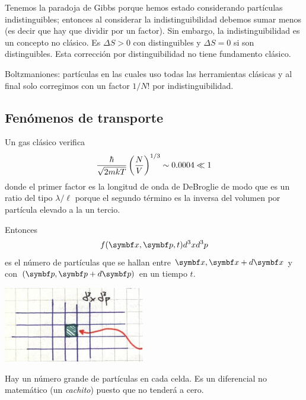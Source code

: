 \documentclass[10pt,oneside]{CBFT_book}
\begin{document}
Tenemos la paradoja de Gibbs porque hemos estado considerando partículas indistinguibles; entonces
al considerar la indistinguibilidad debemos sumar menos (es decir que hay que dividir por un
factor). Sin embargo, la indistinguibilidad es un concepto no clásico.
Es $ \Delta S > 0 $ con distinguibles y $ \Delta S = 0 $ si son distinguibles.
Esta corrección por distinguibilidad no tiene fundamento clásico.

Boltzmaniones: partículas en las cuales uso todas las herramientas clásicas y al final solo
corregimos con un factor $1/N!$ por indistinguibilidad.


\subsection{Fenómenos de transporte}

Un gas clásico verifica
\[
	\frac{\hbar}{\sqrt{2 m k T}} \left( \frac{ N }{ V } \right)^{1/3} \sim 0.0004 \ll 1
\]
donde el primer factor es la longitud de onda de DeBroglie de modo que es un ratio 
del tipo $\lambda / \ell$ porque el segundo término es la inversa del volumen por
partícula elevado a la un tercio.

Entonces
\[
	f(\vb{x}, \vb{p}, t ) d^3x d^3p 
\]
es el número de partículas que se hallan entre $\vb{x}, \vb{x} + d \vb{x}$ y con 
$(\vb{p}, \vb{p} + d \vb{p} )$ en un tiempo $t$.

\includegraphics[scale=0.5]{images/1606329279.jpg}


Hay un número grande de partículas en cada celda. Es un diferencial no matemático (un {\it cachito})
puesto que no tenderá a cero.
\end{document}

